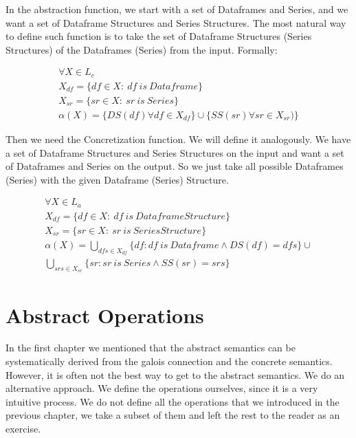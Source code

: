In the abstraction function, we start with a set of Dataframes and Series, and we want a set of Dataframe Structures and
Series Structures.
The most natural way to define such function is to take the set of Dataframe Structures (Series Structures) of the
Dataframes (Series) from the input.
Formally:

\begin{defn}
    \begin{gather*}
        \forall X \in L_c \\
        X_{df} = \{df \in X: \: df \: is \: Dataframe\} \\
        X_{sr} = \{sr \in X: \: sr \: is \: Series\} \\
        \alpha(X) = \{DS(df) \forall df \in X_{df}\} \cup \{SS(sr) \forall sr \in X_{sr})\}
    \end{gather*}
\end{defn}

Then we need the Concretization function.
We will define it analogously.
We have a set of Dataframe Structures and Series Structures on the input and want a set of Dataframes and Series
on the output.
So we just take all possible Dataframes (Series) with the given Dataframe (Series) Structure.

\begin{defn}
    \begin{gather*}
        \forall X \in L_a \\
        X_{df} = \{df \in X: \: df \: is \: Dataframe Structure\} \\
        X_{sr} = \{sr \in X: \: sr \: is \: Series Structure\} \\
        \alpha(X) =
        \bigcup_{dfs \in X_{df}}  \{df: df \: is \: Dataframe \land DS(df) = dfs\}
        \cup \\
        \bigcup_{srs \in X_{sr}} \{sr: sr \: is \: Series \land SS(sr) = srs\}
    \end{gather*}
\end{defn}


\section{Abstract Operations}

In the first chapter we mentioned that the abstract semantics can be systematically derived from the galois connection
and the concrete semantics.
However, it is often not the best way to get to the abstract semantics.
We do an alternative approach.
We define the operations ourselves, since it is a very intuitive process. %
We do not define all the operations that we introduced in the previous chapter, we take a subset of them and left the
rest to the reader as an exercise.

